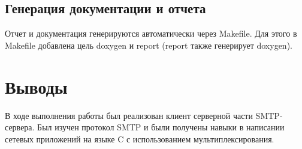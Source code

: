 \documentclass[a4paper,12pt]{report}
\begin{document}
\section{Генерация документации и отчета}
Отчет и документация генерируются автоматически через Makefile.
Для этого в Makefile добавлена цель doxygen и report (report также генерирует doxygen).

\chapter*{Выводы}

В ходе выполнения работы был реализован клиент серверной части SMTP-сервера.
Был изучен протокол SMTP и были получены навыки в написании сетевых приложений на языке C с использованием мультиплексирования.
\end{document}
